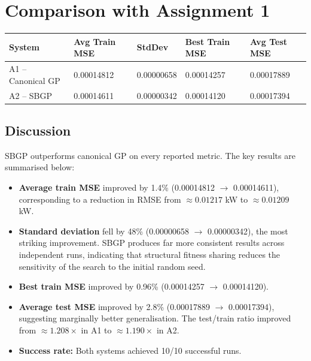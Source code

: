 \documentclass[12pt,a4paper]{article}
\begin{document}
\section{Comparison with Assignment 1}

\begin{center}
\begin{tabular}{@{}L{4cm}C{2.8cm}C{2.2cm}C{2.8cm}C{2.5cm}@{}}
\toprule
\textbf{System} & \textbf{Avg Train MSE} & \textbf{StdDev} & \textbf{Best Train MSE} & \textbf{Avg Test MSE} \\
\midrule
A1 -- Canonical GP & 0.00014812 & 0.00000658 & 0.00014257 & 0.00017889 \\
A2 -- SBGP         & 0.00014611 & 0.00000342 & 0.00014120 & 0.00017394 \\
\bottomrule
\end{tabular}
\end{center}

\subsection*{Discussion}

SBGP outperforms canonical GP on every reported metric. The key results are
summarised below:

\begin{itemize}
  \item \textbf{Average train MSE} improved by 1.4\% (0.00014812 $\to$ 0.00014611),
        corresponding to a reduction in RMSE from $\approx 0.01217$ kW to
        $\approx 0.01209$ kW.
  \item \textbf{Standard deviation} fell by 48\% (0.00000658 $\to$ 0.00000342),
        the most striking improvement. SBGP produces far more consistent results
        across independent runs, indicating that structural fitness sharing reduces
        the sensitivity of the search to the initial random seed.
  \item \textbf{Best train MSE} improved by 0.96\% (0.00014257 $\to$ 0.00014120).
  \item \textbf{Average test MSE} improved by 2.8\% (0.00017889 $\to$ 0.00017394),
        suggesting marginally better generalisation. The test/train ratio improved
        from $\approx 1.208\times$ in A1 to $\approx 1.190\times$ in A2.
  \item \textbf{Success rate:} Both systems achieved 10/10 successful runs.
\end{itemize}
\end{document}
